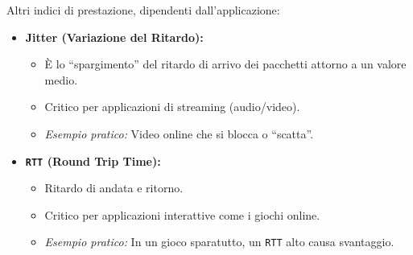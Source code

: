 \documentclass{article}
\begin{document}
Altri indici di prestazione, dipendenti dall'applicazione:
\begin{itemize}
    \item \textbf{Jitter (Variazione del Ritardo):}
    \begin{itemize}
        \item È lo “spargimento” del ritardo di arrivo dei pacchetti attorno a un valore medio.
        \item Critico per applicazioni di streaming (audio/video).
        \item \textit{Esempio pratico:} Video online che si blocca o “scatta”.
    \end{itemize}
    \item \textbf{\texttt{RTT} (Round Trip Time):}
    \begin{itemize}
        \item Ritardo di andata e ritorno.
        \item Critico per applicazioni interattive come i giochi online.
        \item \textit{Esempio pratico:} In un gioco sparatutto, un \texttt{RTT} alto causa svantaggio.
    \end{itemize}
\end{itemize}
\end{document}
